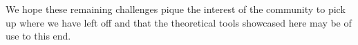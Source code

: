 \documentclass[journal, twocolumn]{IEEEtran}
\begin{document}
We hope these remaining challenges pique the interest of the community to pick up where we have left off and that the theoretical tools showcased here may be of use to this end.


\end{document}
